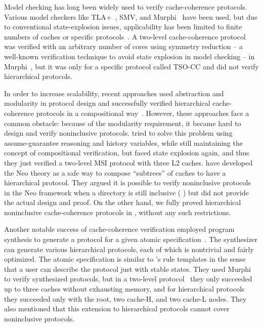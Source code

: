 \documentclass[sigplan,10pt,review,anonymous,screen]{acmart}\settopmatter{printfolios=true,printccs=false,printacmref=false}
\begin{document}

Model checking has long been widely used to verify cache-coherence protocols.
Various model checkers like TLA+~\cite{tla:Lamport:2002}, SMV, and Murphi~\cite{murphi:Dill:1996} have been used, but due to conventional state-explosion issues, applicability has been limited to finite numbers of caches or specific protocols~\cite{Joshi:2003,Komuravelli:2014}.
A two-level cache-coherence protocol was verified with an arbitrary number of cores using symmetry reduction -- a well-known verification technique to avoid state explosion in model checking -- in Murphi~\cite{Banks:2017}, but it was only for a specific protocol called TSO-CC and did not verify hierarchical protocols.

In order to increase scalability, recent approaches used abstraction and modularity in protocol design and successfully verified hierarchical cache-coherence protocols in a compositional way~\cite{Chen:2008,Chen:2010,Opeoluwa:2016,Opeoluwa:2017}.
However, these approaches face a common obstacle: because of the modularity requirement, it became hard to design and verify noninclusive protocols.
\cite{Chen:2008,Chen:2010} tried to solve this problem using assume-guarantee reasoning and history variables, while still maintaining the concept of compositional verification, but faced state explosion again, and thus they just verified a two-level MSI protocol with three L2 caches.
\cite{Opeoluwa:2016,Opeoluwa:2017} have developed the Neo theory as a safe way to compose ``subtrees'' of caches to have a hierarchical protocol.
They argued it is possible to verify noninclusive protocols in the Neo framework when a directory is still inclusive (\eg{} \cite{Zhao:2010}) but did not provide the actual design and proof.
On the other hand, we fully proved hierarchical noninclusive cache-coherence protocols in \hemiola{}, without any such restrictions.

Another notable success of cache-coherence verification employed program synthesis to generate a protocol for a given atomic specification~\cite{Oswald:2018,Oswald:2020}.
The synthesizer can generate various hierarchical protocols, each of which is nontrivial and fairly optimized.
The atomic specification is similar to \hemiola{}'s rule templates in the sense that a user can describe the protocol just with stable states.
They used Murphi to verify synthesized protocols, but in a two-level protocol~\cite{Oswald:2018} they only succeeded up to three caches without exhausting memory, and for hierarchical protocols~\cite{Oswald:2020} they succeeded only with the root, two cache-H, and two cache-L nodes.
They also mentioned that this extension to hierarchical protocols cannot cover noninclusive protocols.
\end{document}
